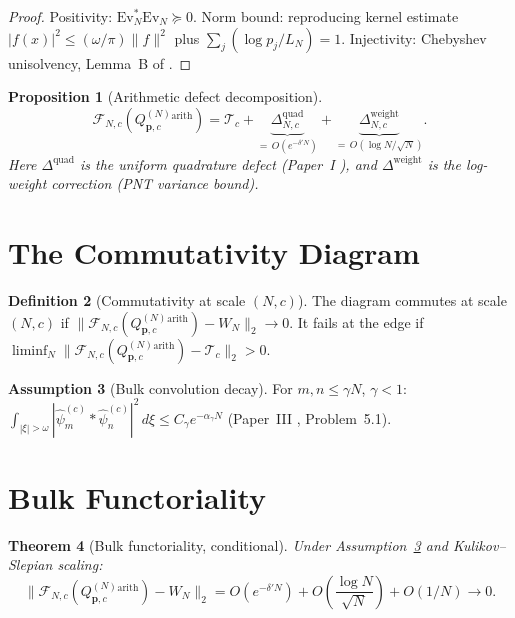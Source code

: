 \documentclass[12pt,a4paper]{amsart}
\newtheorem{theorem}{Theorem}[section]
\newtheorem{proposition}[theorem]{Proposition}
\theoremstyle{definition}
\newtheorem{definition}[theorem]{Definition}
\newtheorem{assumption}[theorem]{Assumption}
\newcommand{\QM}{Q^{(N)}_{\mathbf{p},c}}
\newcommand{\norm}[1]{\|#1\|}
\newcommand{\Fcal}{\mathcal{F}_{N,c}}
\newcommand{\Tcal}{\mathcal{T}_c}
\newcommand{\WeilN}{W_N}
\begin{document}
\begin{proof}
Positivity: $\mathrm{Ev}_N^*\mathrm{Ev}_N\succeq 0$.
Norm bound: reproducing kernel estimate
$|f(x)|^2\le(\omega/\pi)\norm{f}^2$ plus $\sum_j(\log p_j/L_N)=1$.
Injectivity: Chebyshev unisolvency, Lemma~B of \cite{OldPaperI}.
\end{proof}

\begin{proposition}[Arithmetic defect decomposition]%
\label{prop:arith_defect}
\[
  \Fcal(\QM^{\mathrm{arith}})
  = \Tcal
  + \underbrace{\Delta_{N,c}^{\mathrm{quad}}}_{=\,O(e^{-\delta'N})}
  + \underbrace{\Delta_{N,c}^{\mathrm{weight}}}_{=\,O(\log N/\sqrt{N})}.
\]
Here $\Delta^{\mathrm{quad}}$ is the uniform quadrature defect
(Paper~I \cite{OldPaperI}), and $\Delta^{\mathrm{weight}}$ is
the log-weight correction (PNT variance bound).
\end{proposition}

\section{The Commutativity Diagram}\label{sec:diagram}

\begin{definition}[Commutativity at scale $(N,c)$]%
\label{def:commutativity}
The diagram commutes at scale $(N,c)$ if
$\norm{\Fcal(\QM^{\mathrm{arith}}) - \WeilN}_2\to 0$.
It fails at the edge if
$\liminf_N\norm{\Fcal(\QM^{\mathrm{arith}}) - \Tcal}_2 > 0$.
\end{definition}

\begin{assumption}[Bulk convolution decay]\label{ass:bulkconv}
For $m,n\le\gamma N$, $\gamma<1$:
$\int_{|\xi|>\omega}|\hat\psi_m^{(c)}*\hat\psi_n^{(c)}|^2\,d\xi
\le C_\gamma e^{-\alpha_\gamma N}$
(Paper~III \cite{PaperIII}, Problem~5.1).
\end{assumption}

\section{Bulk Functoriality}\label{sec:bulk}

\begin{theorem}[Bulk functoriality, conditional]%
\label{thm:bulk_funct}
Under Assumption~\ref{ass:bulkconv} and Kulikov--Slepian scaling:
\[
  \norm{\Fcal(\QM^{\mathrm{arith}}) - \WeilN}_2
  = O(e^{-\delta'N}) + O\!\left(\frac{\log N}{\sqrt{N}}\right)
  + O(1/N) \to 0.
\]
\end{theorem}
\end{document}
